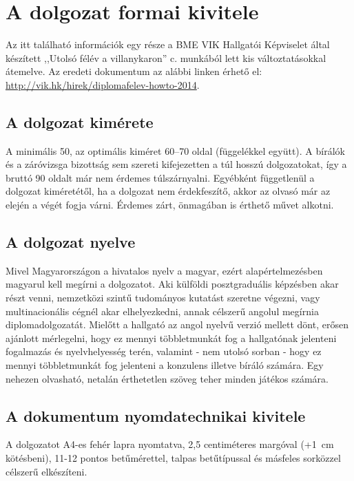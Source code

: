 \chapter{A dolgozat formai kivitele}
Az itt található információk egy része a BME VIK Hallgatói Képviselet által készített ,,Utolsó félév a villanykaron'' c. munkából lett kis változtatásokkal átemelve. Az eredeti dokumentum az alábbi linken érhető el: \url{http://vik.hk/hirek/diplomafelev-howto-2014}.

\section{A dolgozat kimérete}
A minimális 50, az optimális kiméret 60--70 oldal (függelékkel együtt). A bírálók és a záróvizsga bizottság sem szereti kifejezetten a túl hosszú dolgozatokat, így a bruttó 90 oldalt már nem érdemes túlszárnyalni. Egyébként függetlenül a dolgozat kiméretétől, ha a dolgozat nem érdekfeszítő, akkor az olvasó már az elején a végét fogja várni. Érdemes zárt, önmagában is érthető művet alkotni.

\section{A dolgozat nyelve}
Mivel Magyarországon a hivatalos nyelv a magyar, ezért alapértelmezésben magyarul kell megírni a dolgozatot. Aki külföldi posztgraduális képzésben akar részt venni, nemzetközi szintű tudományos kutatást szeretne végezni, vagy multinacionális cégnél akar elhelyezkedni, annak célszerű angolul megírnia diplomadolgozatát. Mielőtt a hallgató az angol nyelvű verzió mellett dönt, erősen ajánlott mérlegelni, hogy ez mennyi többletmunkát fog a hallgatónak jelenteni fogalmazás és nyelvhelyesség terén, valamint - nem utolsó sorban - hogy ez mennyi többletmunkát fog jelenteni a konzulens illetve bíráló számára. Egy nehezen olvasható, netalán érthetetlen szöveg teher minden játékos számára.

\section{A dokumentum nyomdatechnikai kivitele}
A dolgozatot A4-es fehér lapra nyomtatva, 2,5 centiméteres margóval (+1~cm kötésbeni), 11-12 pontos betűmérettel, talpas betűtípussal és másfeles sorközzel célszerű elkészíteni.


